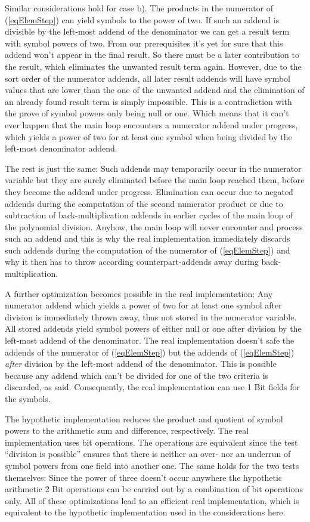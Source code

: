 Similar considerations hold for case b). The products in the numerator of
(\ref{eqElemStep}) can yield symbols to the power of two. If such an
addend is divisible by the left-most addend of the denominator we can get
a result term with symbol powers of two. From our prerequisites it's yet
for sure that this addend won't appear in the final result. So there must
be a later contribution to the result, which eliminates the unwanted
result term again. However, due to the sort order of the numerator
addends, all later result addends will have symbol values that are lower
than the one of the unwanted addend and the elimination of an already
found result term is simply impossible. This is a contradiction with the
prove of symbol powers only being null or one. Which means that it can't
ever happen that the main loop encounters a numerator addend under
progress, which yields a power of two for at least one symbol when being
divided by the left-most denominator addend.

The rest is just the same: Such addends may temporarily occur in the
numerator variable but they are surely eliminated before the main loop
reached them, before they become the addend under progress. Elimination
can occur due to negated addends during the computation of the second
numerator product or due to subtraction of back-multiplication addends in
earlier cycles of the main loop of the polynomial division. Anyhow, the
main loop will never encounter and process such an addend and this is why
the real implementation immediately discards such addends during the
computation of the numerator of (\ref{eqElemStep}) and why it then has to
throw according counterpart-addends away during back-multiplication.

A further optimization becomes possible in the real implementation: Any
numerator addend which yields a power of two for at least one symbol after
division is immediately thrown away, thus not stored in the numerator
variable. All stored addends yield symbol powers of either null or one
after division by the left-most addend of the denominator. The real
implementation doesn't safe the addends of the numerator of
(\ref{eqElemStep}) but the addends of (\ref{eqElemStep}) \emph{after}
division by the left-most addend of the denominator. This is possible
because any addend which can't be divided for one of the two criteria is
discarded, as said. Consequently, the real implementation can use 1 Bit
fields for the symbols.

The hypothetic implementation reduces the product and quotient of symbol
powers to the arithmetic sum and difference, respectively. The real
implementation uses bit operations. The operations are equivalent since
the test ``division is possible'' ensures that there is neither an over- nor
an underrun of symbol powers from one field into another one. The same
holds for the two tests themselves: Since the power of three doesn't occur
anywhere the hypothetic arithmetic 2 Bit operations can be carried out by
a combination of bit operations only. All of these optimizations lead to
an efficient real implementation, which is equivalent to the hypothetic
implementation used in the considerations here.

